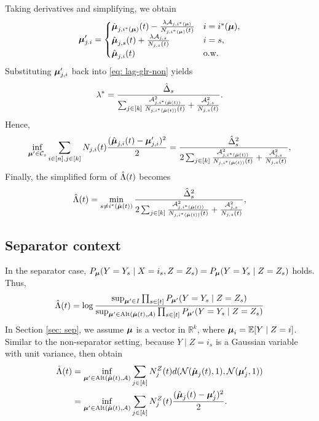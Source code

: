             Taking derivatives and simplifying, we obtain
            \begin{align*}
                \boldsymbol{\mu}'_{j. i} = \begin{cases}
                                    \hat{\boldsymbol{\mu}}_{j,i^*(\boldsymbol{\mu})}(t) - \frac{\lambda \mathcal{A}_{j, i^*(\boldsymbol{\mu})}}{N_{j, i^*(\boldsymbol{\mu})}(t)} &    i = i^*(\boldsymbol{\mu}), \\
                                    \hat{\boldsymbol{\mu}}_{j,s}(t) + \frac{\lambda \mathcal{A}_{j, s}}{N_{j, s}(t)}      &    i = s, \\
                                    \hat{\boldsymbol{\mu}}_{j,i}(t)        &    \text{o.w.}                        
                                \end{cases}       
             \end{align*}
            Substituting $\boldsymbol{\mu}'_{j,i}$ back into \eqref{eq: lag-glr-non} yields
                \begin{align*}
                    \lambda^* = \frac{\hat{\Delta}_{s}}{\sum_{j \in [k]} \frac{\mathcal{A}_{j, i^*(\hat{\boldsymbol{\mu}}(t))}^2}{N_{j,i^*(\hat{\boldsymbol{\mu}}(t))}(t)}  + \frac{\mathcal{A}_{j, s}^2}{N_{j,s}(t)}}.
                \end{align*}
            Hence,
                 \begin{align*}
                    \inf_{\boldsymbol{\mu}' \in \mathcal{C}_s} \sum_{i \in [n], j \in [k]} N_{j,i}(t) \frac{(\hat{\boldsymbol{\mu}}_{j,i}(t) - \boldsymbol{\mu}'_{j,i})^2}{2} =  \frac{\hat{\Delta}_{s}^2}{2 \sum_{j \in [k]} \frac{\mathcal{A}_{j, i^*(\hat{\boldsymbol{\mu}}(t))}^2}{N_{j,i^*(\hat{\boldsymbol{\mu}}(t))}(t)}  + \frac{\mathcal{A}_{j, s}^2}{N_{j,s}(t)}},
                \end{align*}
            Finally, the simplified form of $\hat{\Lambda}(t)$ becomes
                \begin{align*}
                      \hat{\Lambda}(t) = \min_{s \neq  i^*(\hat{\boldsymbol{\mu}}(t))} \frac{\hat{\Delta}_{s}^2}{2 \sum_{j \in [k]} \frac{\mathcal{A}_{j, i^*(\hat{\boldsymbol{\mu}}(t))}^2}{N_{j,i^*(\hat{\boldsymbol{\mu}}(t))}(t)}  + \frac{\mathcal{A}_{j, s}^2}{N_{j,s}(t)}},
                \end{align*}
            
    \subsection{Separator context}\label{apd: glr-sep}
        In the separator case, $P_{\boldsymbol{\mu}} (Y = Y_s \mid X = i_s, Z = Z_s) = P_{\boldsymbol{\mu}} (Y = Y_s \mid Z = Z_s)$ holds. Thus,  
        $$
            \hat{\Lambda}(t)  = \log \frac{\sup_{\boldsymbol{\mu}' \in I} \prod_{s \in [t]} P_{\boldsymbol{\mu}'} (Y = Y_s \mid Z = Z_s)}{\sup_{\boldsymbol{\mu}' \in \text{Alt}(\hat{\boldsymbol{\mu}}(t), \mathcal{A})} \prod_{s \in [t]} P_{\boldsymbol{\mu}'} (Y = Y_s \mid Z = Z_s)} 
        $$
        In Section \ref{sec: sep}, we assume $\boldsymbol{\mu}$ is a vector in $\mathbb{R}^k$, where $\boldsymbol{\mu}_i = \mathbb{E}[Y \mid Z = i]$. Similar to the non-separator setting, because $Y \mid Z = i_s$ is a Gaussian variable with unit variance, then obtain
        \begin{align*}
            \hat{\Lambda}(t) &= \inf_{\boldsymbol{\mu}' \in \text{Alt}(\hat{\boldsymbol{\mu}}(t), \mathcal{A})} \sum_{j \in [k]} N^{Z}_{j}(t) d(\mathcal{N}(\hat{\boldsymbol{\mu}}_{j}(t), 1), \mathcal{N}(\boldsymbol{\mu}'_{j}, 1)) \\
                  &= \inf_{\boldsymbol{\mu}' \in \text{Alt}(\hat{\boldsymbol{\mu}}(t), \mathcal{A})} \sum_{j \in [k]} N^{Z}_{j}(t) \frac{(\hat{\boldsymbol{\mu}}_{j}(t) - \boldsymbol{\mu}'_{j})^2}{2}.
        \end{align*}


